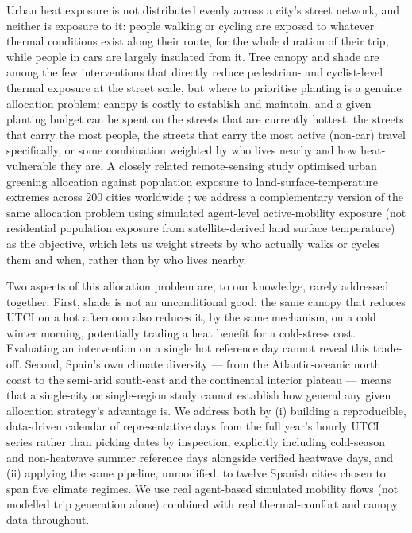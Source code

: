 \documentclass[pdflatex,sn-mathphys-ay]{sn-jnl}
\begin{document}
\maketitle


Urban heat exposure is not distributed evenly across a city's street network,
and neither is exposure to it: people walking or cycling are exposed to
whatever thermal conditions exist along their route, for the whole duration of
their trip, while people in cars are largely insulated from it. Tree canopy
and shade are among the few interventions that directly reduce pedestrian- and
cyclist-level thermal exposure at the street scale, but where to prioritise
planting is a genuine allocation problem: canopy is costly to establish and
maintain, and a given planting budget can be spent on the streets that are
currently hottest, the streets that carry the most people, the streets that
carry the most active (non-car) travel specifically, or some combination
weighted by who lives nearby and how heat-vulnerable they are. A closely
related remote-sensing study optimised urban greening allocation against
population exposure to land-surface-temperature extremes across 200 cities
worldwide \cite{massaro2023greening}; we address a complementary version of
the same allocation problem using simulated agent-level active-mobility
exposure (not residential population exposure from satellite-derived land
surface temperature) as the objective, which lets us weight streets by who
actually walks or cycles them and when, rather than by who lives nearby.

Two aspects of this allocation problem are, to our knowledge, rarely
addressed together. First, shade is not an unconditional good: the same
canopy that reduces UTCI on a hot afternoon also reduces it, by the same
mechanism, on a cold winter morning, potentially trading a heat benefit for a
cold-stress cost. Evaluating an intervention on a single hot reference day
cannot reveal this trade-off. Second, Spain's own climate diversity --- from
the Atlantic-oceanic north coast to the semi-arid south-east and the
continental interior plateau --- means that a single-city or single-region
study cannot establish how general any given allocation strategy's advantage
is. We address both by (i) building a reproducible, data-driven calendar of
representative days from the full year's hourly UTCI series rather than
picking dates by inspection, explicitly including cold-season and
non-heatwave summer reference days alongside verified heatwave days, and (ii)
applying the same pipeline, unmodified, to twelve Spanish cities chosen to
span five climate regimes. We use real agent-based simulated mobility flows
(not modelled trip generation alone) combined with real thermal-comfort and
canopy data throughout.
\end{document}
